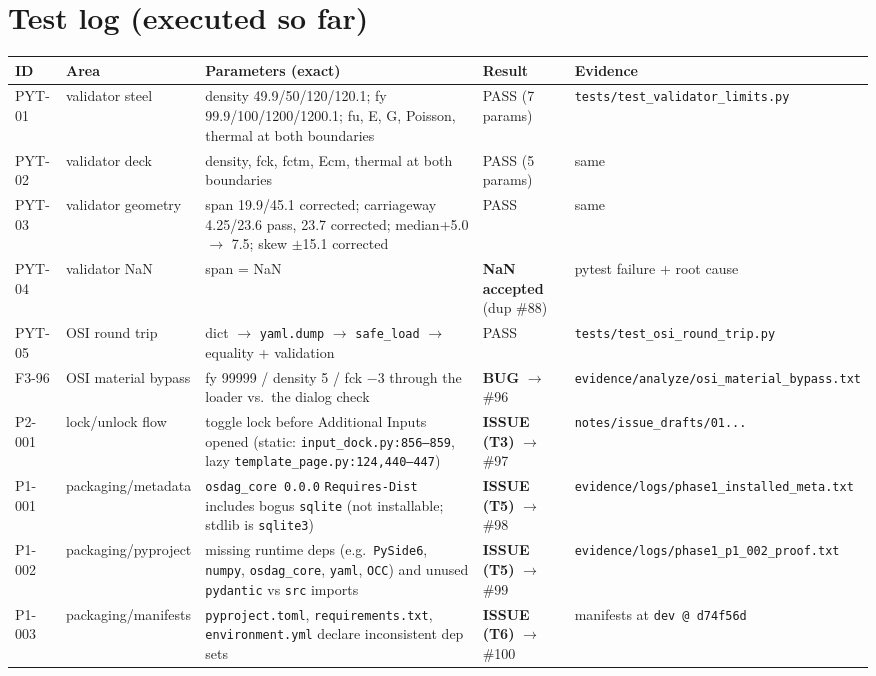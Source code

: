 \documentclass[11pt,a4paper]{article}
\begin{document}
\section{Test log (executed so far)}
\begin{longtable}{@{}p{1.4cm}p{3.0cm}p{6.2cm}p{2.6cm}p{2.0cm}@{}}
\toprule
ID & Area & Parameters (exact) & Result & Evidence \\
\midrule
PYT-01 & validator steel & density 49.9/50/120/120.1; fy 99.9/100/1200/1200.1; fu, E, G, Poisson, thermal at both boundaries & PASS (7 params) & \texttt{tests/test\_validator\_limits.py} \\
PYT-02 & validator deck & density, fck, fctm, Ecm, thermal at both boundaries & PASS (5 params) & same \\
PYT-03 & validator geometry & span 19.9/45.1 corrected; carriageway 4.25/23.6 pass, 23.7 corrected; median+5.0 $\rightarrow$ 7.5; skew $\pm$15.1 corrected & PASS & same \\
PYT-04 & validator NaN & span = NaN & \textbf{NaN accepted} (dup \#88) & pytest failure + root cause \\
PYT-05 & OSI round trip & dict $\rightarrow$ \texttt{yaml.dump} $\rightarrow$ \texttt{safe\_load} $\rightarrow$ equality + validation & PASS & \texttt{tests/test\_osi\_round\_trip.py} \\
F3-96 & OSI material bypass & fy 99999 / density 5 / fck $-$3 through the loader vs.\ the dialog check & \textbf{BUG} $\rightarrow$ \#96 & \texttt{evidence/analyze/osi\_material\_bypass.txt} \\
P2-001 & lock/unlock flow & toggle lock before Additional Inputs opened (static: \texttt{input\_dock.py:856--859}, lazy \texttt{template\_page.py:124,440--447}) & \textbf{ISSUE (T3)} $\rightarrow$ \#97 & \texttt{notes/issue\_drafts/01...} \\
P1-001 & packaging/metadata & \texttt{osdag\_core 0.0.0} \texttt{Requires-Dist} includes bogus \texttt{sqlite} (not installable; stdlib is \texttt{sqlite3}) & \textbf{ISSUE (T5)} $\rightarrow$ \#98 & \texttt{evidence/logs/phase1\_installed\_meta.txt} \\
P1-002 & packaging/pyproject & missing runtime deps (e.g.\ \texttt{PySide6}, \texttt{numpy}, \texttt{osdag\_core}, \texttt{yaml}, \texttt{OCC}) and unused \texttt{pydantic} vs \texttt{src} imports & \textbf{ISSUE (T5)} $\rightarrow$ \#99 & \texttt{evidence/logs/phase1\_p1\_002\_proof.txt} \\
P1-003 & packaging/manifests & \texttt{pyproject.toml}, \texttt{requirements.txt}, \texttt{environment.yml} declare inconsistent dep sets & \textbf{ISSUE (T6)} $\rightarrow$ \#100 & manifests at \texttt{dev @ d74f56d} \\

\end{longtable}
\end{document}
